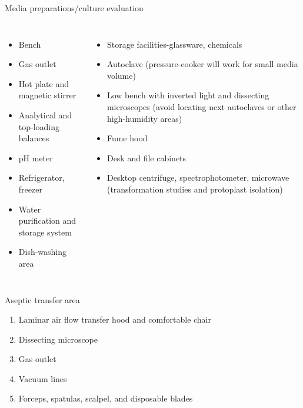 \documentclass[
  ignorenonframetext,
  aspectratio=169]{beamer}
\providecommand{\tightlist}{%
  \setlength{\itemsep}{0pt}\setlength{\parskip}{0pt}}
\begin{document}
\begin{frame}{Media preparations/culture evaluation}
\protect\hypertarget{media-preparationsculture-evaluation}{}
\begin{columns}[T,onlytextwidth]
  \begin{itemize}

  \item Bench
  \item Gas outlet
  \item Hot plate and magnetic stirrer
  \item Analytical and top-loading balances
  \item pH meter
  \item Refrigerator, freezer
  \item Water purification and storage system
  \item Dish-washing area
  \end{itemize}


  \begin{itemize}

  \item Storage facilities-glassware, chemicals
  \item Autoclave (pressure-cooker will work for small media volume)
  \item Low bench with inverted light and dissecting microscopes (avoid locating next autoclaves or other high-humidity areas)
  \item Fume hood
  \item Desk and file cabinets
  \item Desktop centrifuge, spectrophotometer, microwave (transformation studies and protoplast isolation)

  \end{itemize}

\end{columns}
\end{frame}

\begin{frame}{Aseptic transfer area}
\protect\hypertarget{aseptic-transfer-area}{}
\begin{enumerate}
\tightlist
\item
  Laminar air flow transfer hood and comfortable chair
\item
  Dissecting microscope
\item
  Gas outlet
\item
  Vacuum lines
\item
  Forceps, spatulas, scalpel, and disposable blades
\end{enumerate}
\end{frame}
\end{document}
